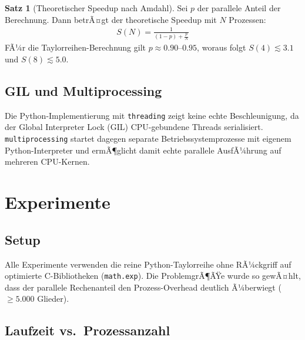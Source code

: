 ﻿\documentclass[a4paper,12pt]{article}
\theoremstyle{definition}
\newtheorem{satz}{Satz}
\begin{document}
\begin{satz}[Theoretischer Speedup nach Amdahl]
Sei $p$ der parallele Anteil der Berechnung. Dann betrÃ¤gt der theoretische
Speedup mit $N$ Prozessen:
\begin{align}
  S(N) = \frac{1}{(1-p) + \tfrac{p}{N}}
\end{align}
FÃ¼r die Taylorreihen-Berechnung gilt $p \approx 0.90\text{--}0.95$,
woraus folgt $S(4) \lesssim 3.1$ und $S(8) \lesssim 5.0$.
\end{satz}

\subsection{GIL und Multiprocessing}

Die Python-Implementierung mit \texttt{threading} zeigt keine echte
Beschleunigung, da der Global Interpreter Lock (GIL) CPU-gebundene Threads
serialisiert. \texttt{multiprocessing} startet dagegen separate
Betriebssystemprozesse mit eigenem Python-Interpreter und ermÃ¶glicht damit
echte parallele AusfÃ¼hrung auf mehreren CPU-Kernen.

\section{Experimente}

\subsection{Setup}

Alle Experimente verwenden die reine Python-Taylorreihe ohne RÃ¼ckgriff auf
optimierte C-Bibliotheken (\texttt{math.exp}). Die ProblemgrÃ¶ÃŸe wurde so
gewÃ¤hlt, dass der parallele Rechenanteil den Prozess-Overhead deutlich
Ã¼berwiegt ($\geq 5.000$ Glieder).

\subsection{Laufzeit vs.\ Prozessanzahl}
\end{document}
